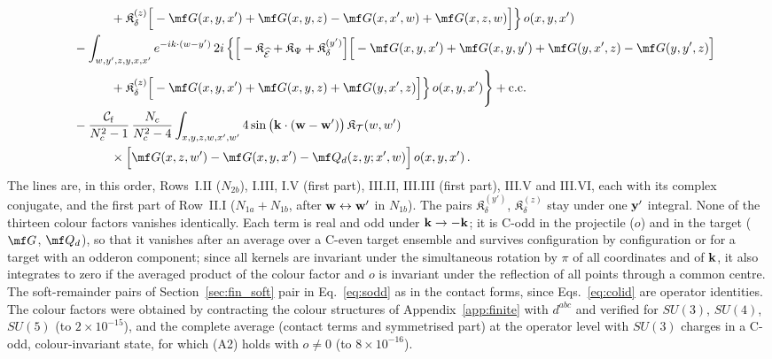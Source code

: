 {{\begin{align}
&\qquad\qquad+\mathfrak K^{(z)}_\delta\Big[-\mf G(x,y,x')+\mf G(x,y,z)-\mf G(x,x',w)+\mf G(x,z,w)\Big]\Big\}\,o(x,y,x')\notag\\
&\quad-\int_{w,y',z,y,x,x'}e^{-ik\cdot(w-y')}\,2i\,\Big\{\Big[-\mathfrak K_{\widehat{\mathcal E}}+\mathfrak K_\Psi+\mathfrak K^{(y')}_\delta\Big]\Big[-\mf G(x,y,x')+\mf G(x,y,y')+\mf G(y,x',z)-\mf G(y,y',z)\Big]\notag\\
&\qquad\qquad+\mathfrak K^{(z)}_\delta\Big[-\mf G(x,y,x')+\mf G(x,y,z)+\mf G(y,x',z)\Big]\Big\}\,o(x,y,x')\Bigg\}+{\rm c.c.}\notag\\
&\quad-\frac{\mathcal C_{\rm f}}{N_c^2-1}\,\frac{N_c}{N_c^2-4}\int_{x,y,z,w,x',w'}4\sin\big(\v k\cdot(\v w-\v w')\big)\,\mathfrak K_{\mathcal T}(w,w')\notag\\
&\qquad\qquad\times\Big[\mf G(x,z,w')-\mf G(x,y,x')-\mf Q_d(z,y;x',w)\Big]\,o(x,y,x')\,.
\end{align}
The lines are, in this order, Rows~I.II ($N_{2b}$), I.III, I.V (first part), III.II, III.III (first part), III.V and III.VI, each with its complex conjugate, and the first part of Row~II.I ($N_{1a}+N_{1b}$, after $\mathbf{w}\leftrightarrow\mathbf{w}'$ in $N_{1b}$). The pairs $\mathfrak K^{(y')}_\delta$, $\mathfrak K^{(z)}_\delta$ stay under one $\mathbf{y}'$ integral. None of the thirteen colour factors vanishes identically. Each term is real and odd under $\mathbf{k}\to-\mathbf{k}$; it is C-odd in the projectile ($o$) and in the target ($\mf G$, $\mf Q_d$), so that it vanishes after an average over a C-even target ensemble and survives configuration by configuration or for a target with an odderon component; since all kernels are invariant under the simultaneous rotation by $\pi$ of all coordinates and of $\mathbf{k}$, it also integrates to zero if the averaged product of the colour factor and $o$ is invariant under the reflection of all points through a common centre. The soft-remainder pairs of Section~\ref{sec:fin_soft} pair in Eq.~\eqref{eq:sodd} as in the contact forms, since Eqs.~\eqref{eq:colid} are operator identities. The colour factors were obtained by contracting the colour structures of Appendix~\ref{app:finite} with $d^{abc}$ and verified for $SU(3)$, $SU(4)$, $SU(5)$ (to $2\times10^{-15}$), and the complete average (contact terms and symmetrised part) at the operator level with $SU(3)$ charges in a C-odd, colour-invariant state, for which (A2) holds with $o\neq0$ (to $8\times10^{-16}$).
}}

